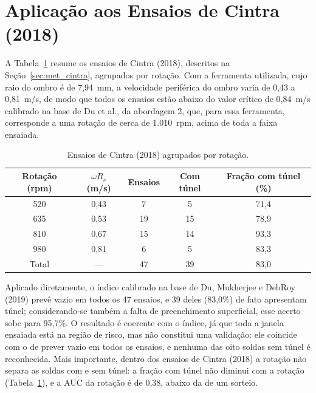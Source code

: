 \documentclass[12pt,openany]{report}
\begin{document}
\section{Aplicação aos Ensaios de Cintra (2018)}
\label{sec:cintra}

A Tabela~\ref{tab:cintra} resume os ensaios de Cintra (2018), descritos na Seção~\ref{sec:met_cintra}, agrupados por rotação. Com a ferramenta utilizada, cujo raio do ombro é de 7,94~mm, a velocidade periférica do ombro varia de 0,43 a 0,81~m/s, de modo que todos os ensaios estão abaixo do valor crítico de 0,84~m/s calibrado na base de Du et al., da abordagem 2, que, para essa ferramenta, corresponde a uma rotação de cerca de 1.010~rpm, acima de toda a faixa ensaiada.

\begin{table}[htbp]
\centering
\caption{Ensaios de Cintra (2018) agrupados por rotação.}
\label{tab:cintra}
\small
\begin{tabular}{ccccc}
\toprule
\textbf{Rotação (rpm)} & \textbf{$\omega R_s$ (m/s)} & \textbf{Ensaios} & \textbf{Com túnel} & \textbf{Fração com túnel (\%)} \\ \midrule
520 & 0,43 & 7 & 5 & 71,4 \\
635 & 0,53 & 19 & 15 & 78,9 \\
810 & 0,67 & 15 & 14 & 93,3 \\
980 & 0,81 & 6 & 5 & 83,3 \\ \midrule
Total & --- & 47 & 39 & 83,0 \\ \bottomrule
\end{tabular}
\end{table}

Aplicado diretamente, o índice calibrado na base de Du, Mukherjee e DebRoy (2019) prevê vazio em todos os 47 ensaios, e 39 deles (83,0\%) de fato apresentam túnel; considerando-se também a falta de preenchimento superficial, esse acerto sobe para 95,7\%. O resultado é coerente com o índice, já que toda a janela ensaiada está na região de risco, mas não constitui uma validação: ele coincide com o de prever vazio em todos os ensaios, e nenhuma das oito soldas sem túnel é reconhecida. Mais importante, dentro dos ensaios de Cintra (2018) a rotação não separa as soldas com e sem túnel: a fração com túnel não diminui com a rotação (Tabela~\ref{tab:cintra}), e a AUC da rotação é de 0,38, abaixo da de um sorteio.
\end{document}
